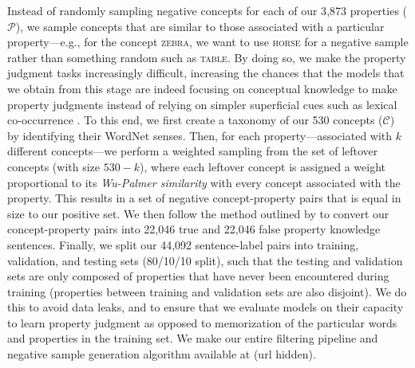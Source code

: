 \documentclass[10pt,letterpaper]{article}
\newcommand{\concepts}{\mathcal{C}}
\newcommand{\properties}{\mathcal{P}}
\begin{document}
Instead of randomly sampling negative concepts for each of our 3{,}873 properties ($\properties$), we sample concepts that are similar to those associated with a particular property---e.g., for the concept \textsc{zebra}, we want to use \textsc{horse} for a negative sample rather than something random such as \textsc{table}.
By doing so, we make the property judgment tasks increasingly difficult, increasing the chances that the models that we obtain from this stage are indeed focusing on conceptual knowledge to make property judgments instead of relying on simpler superficial cues such as lexical co-occurrence \citep{mccoy-etal-2019-right}.  
To this end, we first create a taxonomy of our 530 concepts ($\concepts$) by identifying their WordNet \citep{miller1995wordnet} senses.
Then, for each property---associated with $k$ different concepts---we perform a weighted sampling from the set of leftover concepts (with size $530-k$), where each leftover concept is assigned a weight proportional to its \textit{Wu-Palmer similarity} \citep[a commonly used taxonomic similarity computed over the subset of wordnet taxonomy;][]{wu-palmer-1994-verb} with every concept associated with the property. 
This results in a set of negative concept-property pairs that is equal in size to our positive set.
We then follow the method outlined by \citet{bhatia2020transformer} to convert our concept-property pairs into 22{,}046 true and 22{,}046 false property knowledge sentences.
Finally, we split our 44{,}092 sentence-label pairs into training, validation, and testing sets (80/10/10 split), such that the testing and validation sets are only composed of properties that have never been encountered during training (properties between training and validation sets are also disjoint). 
We do this to avoid data leaks, and to ensure that we evaluate models on their capacity to learn property judgment as opposed to memorization of the particular words and properties in the training set. 
We make our entire filtering pipeline and negative sample generation algorithm available at (url hidden).
\end{document}

